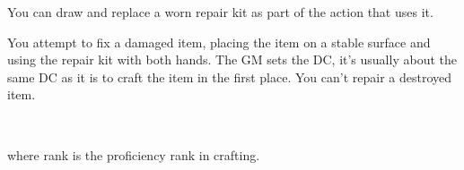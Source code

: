 


You can draw and replace a worn repair kit as part of the action that uses it.

You attempt to fix a damaged item, placing the item on a stable surface and using the repair kit with both hands.
The GM sets the DC, it's usually about the same DC as it is to craft the item in the first place.
You can't repair a destroyed item.

 \\

where rank is the proficiency rank in crafting.
\vfill

\hfill{}
